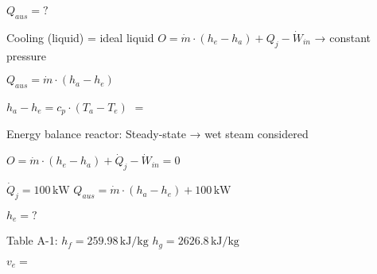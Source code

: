 \( Q_{aus} = ? \)  

Cooling (liquid) = ideal liquid  
\( O = \dot{m} \cdot (h_e - h_a) + Q_j - \dot{W}_{in} \) → constant pressure  

\( Q_{aus} = \dot{m} \cdot (h_a - h_e) \)  

\( h_a - h_e = c_p \cdot (T_a - T_e) \)  
\( = \)  

Energy balance reactor:  
Steady-state → wet steam considered  

\( O = \dot{m} \cdot (h_e - h_a) + \dot{Q}_j - \dot{W}_{in} = 0 \)  

\( \dot{Q}_j = 100 \, \text{kW} \)  
\( Q_{aus} = \dot{m} \cdot (h_a - h_e) + 100 \, \text{kW} \)  

\( h_e = ? \)  

Table A-1:  
\( h_f = 259.98 \, \text{kJ/kg} \)  
\( h_g = 2626.8 \, \text{kJ/kg} \)  

\( v_e = \)